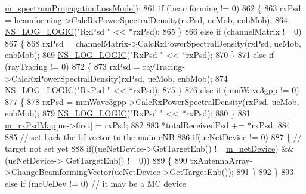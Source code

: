 \begin{DoxyCode}
      \hyperlink{classns3_1_1MmWavePhy_a3d7feea996066a51496915c8c232daa4}{m\_spectrumPropagationLossModel});
861                 \textcolor{keywordflow}{if} (beamforming != 0)
862                 \{
863                         rxPsd = beamforming->CalcRxPowerSpectralDensity(rxPsd, ueMob, enbMob);
864                         \hyperlink{group__logging_ga88acd260151caf2db9c0fc84997f45ce}{NS\_LOG\_LOGIC}(\textcolor{stringliteral}{"RxPsd "} << *rxPsd);
865                 \}
866                 \textcolor{keywordflow}{else} \textcolor{keywordflow}{if} (channelMatrix != 0)
867                 \{
868                         rxPsd = channelMatrix->CalcRxPowerSpectralDensity(rxPsd, ueMob, enbMob);
869                         \hyperlink{group__logging_ga88acd260151caf2db9c0fc84997f45ce}{NS\_LOG\_LOGIC}(\textcolor{stringliteral}{"RxPsd "} << *rxPsd);
870                 \}
871                 \textcolor{keywordflow}{else} \textcolor{keywordflow}{if} (rayTracing != 0)
872                 \{
873                         rxPsd = rayTracing->CalcRxPowerSpectralDensity(rxPsd, ueMob, enbMob);
874                         \hyperlink{group__logging_ga88acd260151caf2db9c0fc84997f45ce}{NS\_LOG\_LOGIC}(\textcolor{stringliteral}{"RxPsd "} << *rxPsd);
875                 \}
876                 \textcolor{keywordflow}{else} \textcolor{keywordflow}{if} (mmWave3gpp != 0)
877                 \{
878                         rxPsd = mmWave3gpp->CalcRxPowerSpectralDensity(rxPsd, ueMob, enbMob);
879                         \hyperlink{group__logging_ga88acd260151caf2db9c0fc84997f45ce}{NS\_LOG\_LOGIC}(\textcolor{stringliteral}{"RxPsd "} << *rxPsd);
880                 \}       
881                 \hyperlink{classns3_1_1MmWaveEnbPhy_a40b3813d00f430aed47e1ee084df4d78}{m\_rxPsdMap}[ue->first] = rxPsd;
882 
883                 *totalReceivedPsd += *rxPsd;
884 
885                 \textcolor{comment}{// set back the bf vector to the main eNB}
886                 \textcolor{keywordflow}{if}(ueNetDevice != 0) 
887                 \{                                                                                                               \textcolor{comment}{
      // target not set yet}
888                         \textcolor{keywordflow}{if}((ueNetDevice->GetTargetEnb() != \hyperlink{classns3_1_1MmWavePhy_a0f14f4e8f7539b06497ba321d9df344c}{m\_netDevice}) && (ueNetDevice->
      GetTargetEnb() != 0))
889                         \{
890                                 txAntennaArray->ChangeBeamformingVector(ueNetDevice->GetTargetEnb());
891                         \}
892                 \}
893                 \textcolor{keywordflow}{else} \textcolor{keywordflow}{if} (mcUeDev != 0) \textcolor{comment}{// it may be a MC device}

\end{DoxyCode}
